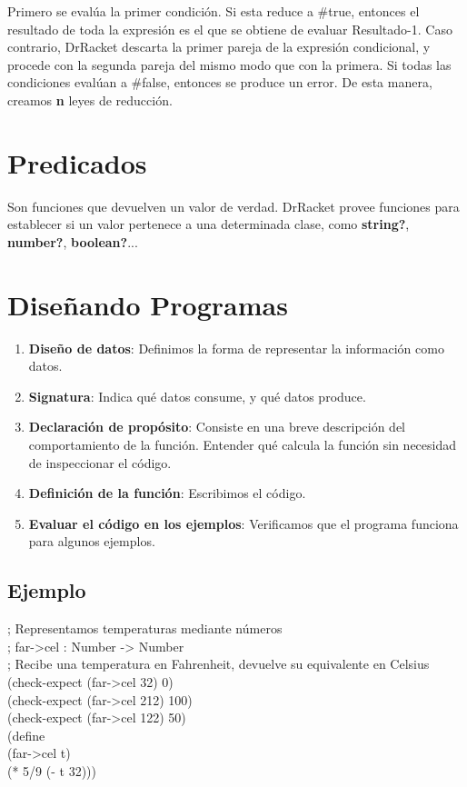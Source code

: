 \documentclass[11pt,a4paper]{article}
\begin{document}
\noindent Primero se evalúa la primer condición. Si esta reduce a \#true, entonces el resultado de toda la expresión es el que se obtiene de evaluar Resultado-1. Caso contrario, DrRacket descarta la primer pareja de la expresión condicional, y procede con la segunda pareja del mismo modo que con la primera. Si todas las condiciones evalúan a \#false, entonces se produce un error. De esta manera, creamos \textbf{n} leyes de reducci\'on.

\section{Predicados}
Son funciones que devuelven un valor de verdad. DrRacket provee funciones para establecer si un valor pertenece a una
determinada clase, como \textbf{string?}, \textbf{number?}, \textbf{boolean?}...

\newpage
\section{Dise\~nando Programas}
\begin{enumerate}
\item \textbf{Diseño de datos}: Definimos la forma de representar la información como datos.
\item \textbf{Signatura}: Indica qué datos consume, y qué datos produce.
\item \textbf{Declaración de propósito}: Consiste en una breve descripción del comportamiento de la función. Entender qué calcula la función sin necesidad de inspeccionar el código.
\item \textbf{Definición de la función}: Escribimos el código.
\item \textbf{Evaluar el código en los ejemplos}: Verificamos que el programa funciona para algunos ejemplos.
\end{enumerate}
\subsection{Ejemplo}
\begin{siderules}
; Representamos temperaturas mediante números\\
; far->cel : Number -> Number\\
; Recibe una temperatura en Fahrenheit, devuelve su equivalente en Celsius\\
(check-expect (far->cel 32) 0)\\
(check-expect (far->cel 212) 100)\\
(check-expect (far->cel 122) 50)\\
(define\\
\indent \indent (far->cel t)\\
\indent \indent (* 5/9 (- t 32)))
\end{siderules}
\end{document}
